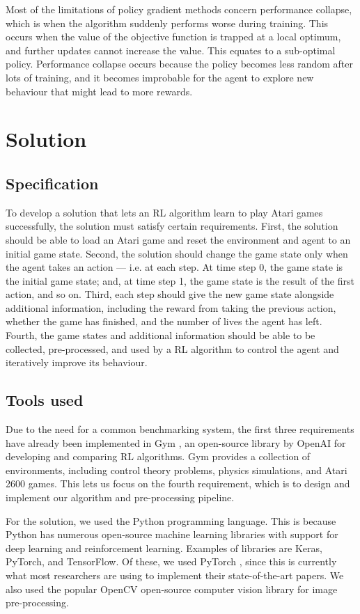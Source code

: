 \documentclass[12pt,a4paper]{article}
\begin{document}
Most of the limitations of policy gradient methods concern performance collapse, which is when the algorithm suddenly performs worse during training. This occurs when the value of the objective function is trapped at a local optimum, and further updates cannot increase the value. This equates to a sub-optimal policy. Performance collapse occurs because the policy becomes less random after lots of training, and it becomes improbable for the agent to explore new behaviour that might lead to more rewards.

\section{Solution}
\subsection{Specification}
To develop a solution that lets an RL algorithm learn to play Atari games successfully, the solution must satisfy certain requirements. First, the solution should be able to load an Atari game and reset the environment and agent to an initial game state. Second, the solution should change the game state only when the agent takes an action --- i.e. at each step. At time step 0, the game state is the initial game state; and, at time step 1, the game state is the result of the first action, and so on. Third, each step should give the new game state alongside additional information, including the reward from taking the previous action, whether the game has finished, and the number of lives the agent has left. Fourth, the game states and additional information should be able to be collected, pre-processed, and used by a RL algorithm to control the agent and iteratively improve its behaviour.

\subsection{Tools used}
Due to the need for a common benchmarking system, the first three requirements have already been implemented in Gym \cite{1606.01540}, an open-source library by OpenAI for developing and comparing RL algorithms. Gym provides a collection of environments, including control theory problems, physics simulations, and Atari 2600 games. This lets us focus on the fourth requirement, which is to design and implement our algorithm and pre-processing pipeline.

For the solution, we used the Python programming language. This is because Python has numerous open-source machine learning libraries with support for deep learning and reinforcement learning. Examples of libraries are Keras, PyTorch, and TensorFlow. Of these, we used PyTorch \cite{NEURIPS2019_9015}, since this is currently what most researchers are using to implement their state-of-the-art papers. We also used the popular OpenCV \cite{opencv_library} open-source computer vision library for image pre-processing.
\end{document}
